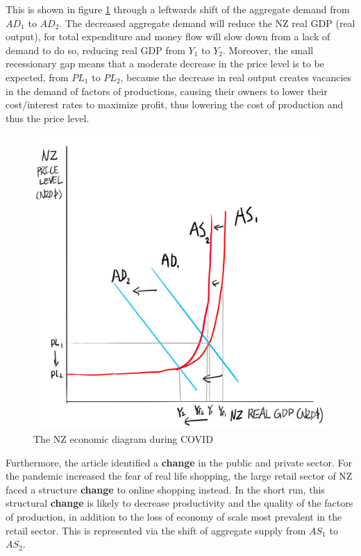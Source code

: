 \documentclass[a4paper,12pt]{article}
\begin{document}
This is shown in figure \ref{fig:asad} through a leftwards shift of the aggregate demand from $AD_1$ to $AD_2$. The decreased aggregate demand will reduce the NZ real GDP (real output), for total expenditure and money flow will slow down from a lack of demand to do so, reducing real GDP from $Y_1$ to $Y_2$. Moreover, the small recessionary gap means that a moderate decrease in the price level is to be expected, from $PL_1$ to $PL_2$, because the decrease in real output creates vacancies in the demand of factors of productions, causing their owners to lower their cost/interest rates to maximize profit, thus lowering the cost of production and thus the price level.

\begin{figure}[H]
    \centering
    \includegraphics[scale=0.6]{assets/asad.png}
    \caption{The NZ economic diagram during COVID}
    \label{fig:asad}
\end{figure}

Furthermore, the article identified a \textbf{change} in the public and private sector. For the pandemic increased the fear of real life shopping, the large retail sector of NZ faced a structure \textbf{change} to online shopping instead. In the short run, this structural \textbf{change} is likely to decrease productivity and the quality of the factors of production, in addition to the loss of economy of scale most prevalent in the retail sector. This is represented via the shift of aggregate supply from $AS_1$ to $AS_2$.
\end{document}
